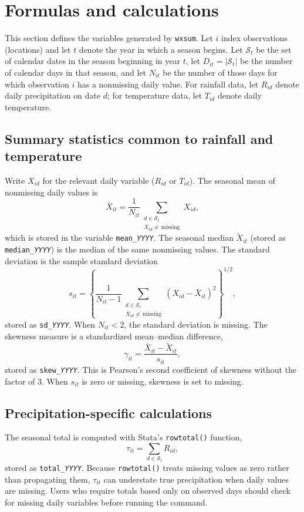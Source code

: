 \section{Formulas and calculations}

This section defines the variables generated by \texttt{wxsum}. Let $i$ index observations (locations) and let $t$ denote the year in which a season begins. Let $\mathcal{S}_{t}$ be the set of calendar dates in the season beginning in year $t$, let $D_{it}=|\mathcal{S}_{t}|$ be the number of calendar days in that season, and let $N_{it}$ be the number of those days for which observation $i$ has a nonmissing daily value. For rainfall data, let $R_{id}$ denote daily precipitation on date $d$; for temperature data, let $T_{id}$ denote daily temperature.

\subsection{Summary statistics common to rainfall and temperature}

Write $X_{id}$ for the relevant daily variable ($R_{id}$ or $T_{id}$). The seasonal mean of nonmissing daily values is
\[
\bar{X}_{it} = \frac{1}{N_{it}}\sum_{\substack{d\in\mathcal{S}_{t} \\ X_{id}\neq\,\text{missing}}} X_{id},
\]
which is stored in the variable \texttt{mean\_\textit{YYYY}}. The seasonal median $\tilde{X}_{it}$ (stored as \texttt{median\_\textit{YYYY}}) is the median of the same nonmissing values. The standard deviation is the sample standard deviation
\[
s_{it} = \left\{\frac{1}{N_{it}-1}\sum_{\substack{d\in\mathcal{S}_{t} \\ X_{id}\neq\,\text{missing}}} \left(X_{id}-\bar{X}_{it}\right)^2\right\}^{1/2},
\]
stored as \texttt{sd\_\textit{YYYY}}. When $N_{it}<2$, the standard deviation is missing. The skewness measure is a standardized mean--median difference,
\[
\gamma_{it} = \frac{\bar{X}_{it}-\tilde{X}_{it}}{s_{it}},
\]
stored as \texttt{skew\_\textit{YYYY}}. This is Pearson's second coefficient of skewness without the factor of 3. When $s_{it}$ is zero or missing, skewness is set to missing.

\subsection{Precipitation-specific calculations}

The seasonal total is computed with Stata's \texttt{rowtotal()} function,
\[
\tau_{it} = \sum_{d\in\mathcal{S}_{t}} R_{id},
\]
stored as \texttt{total\_\textit{YYYY}}. Because \texttt{rowtotal()} treats missing values as zero rather than propagating them, $\tau_{it}$ can understate true precipitation when daily values are missing. Users who require totals based only on observed days should check for missing daily variables before running the command.

